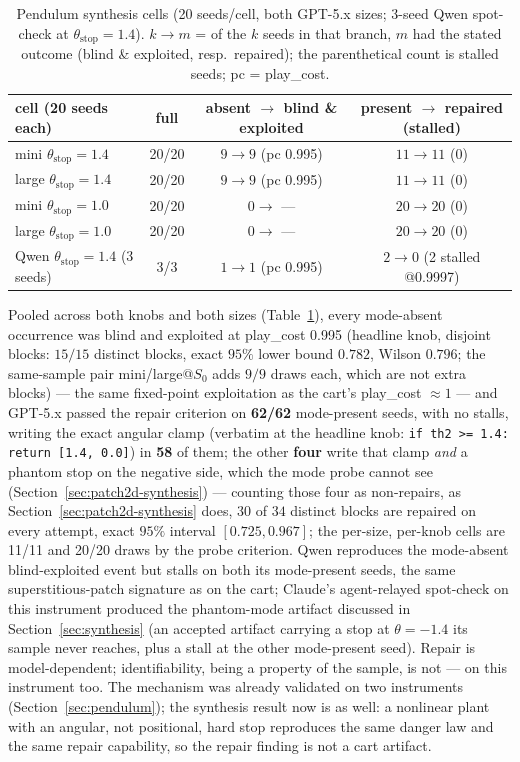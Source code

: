 \documentclass[11pt]{article}
\theoremstyle{definition}
\theoremstyle{remark}
\begin{document}
\begin{table}[ht]
\centering
\footnotesize
\begin{tabular}{lccc}
\toprule
cell (20 seeds each) & full & absent $\to$ blind \& exploited & present $\to$ repaired (stalled) \\
\midrule
mini $\theta_\mathrm{stop}=1.4$ & 20/20 & $9 \to 9$ (pc 0.995) & $11 \to 11$ (0) \\
large $\theta_\mathrm{stop}=1.4$ & 20/20 & $9 \to 9$ (pc 0.995) & $11 \to 11$ (0) \\
mini $\theta_\mathrm{stop}=1.0$ & 20/20 & $0 \to$ --- & $20 \to 20$ (0) \\
large $\theta_\mathrm{stop}=1.0$ & 20/20 & $0 \to$ --- & $20 \to 20$ (0) \\
Qwen $\theta_\mathrm{stop}=1.4$ (3 seeds) & 3/3 & $1 \to 1$ (pc 0.995) & $2 \to 0$ (2 stalled @0.9997) \\
\bottomrule
\end{tabular}
\caption{Pendulum synthesis cells (20 seeds/cell, both GPT-5.x sizes; 3-seed Qwen spot-check at $\theta_\mathrm{stop}=1.4$). $k \to m$ = of the $k$ seeds in that branch, $m$ had the stated outcome (blind \& exploited, resp.\ repaired); the parenthetical count is stalled seeds; pc = play\_cost.}
\label{tab:pendulum-synthesis}
\end{table}

Pooled across both knobs and both sizes (Table~\ref{tab:pendulum-synthesis}), every mode-absent occurrence was blind and exploited at play\_cost 0.995 (headline knob, disjoint blocks: $15/15$ distinct blocks, exact $95\%$ lower bound $0.782$, Wilson $0.796$; the same-sample pair mini/large@$S_0$ adds $9/9$ draws each, which are not extra blocks) --- the same fixed-point exploitation as the cart's play\_cost $\approx 1$ --- and GPT-5.x passed the repair criterion on \textbf{62/62} mode-present seeds, with no stalls, writing the exact angular clamp (verbatim at the headline knob: \texttt{if th2 >= 1.4: return [1.4, 0.0]}) in \textbf{58} of them; the other \textbf{four} write that clamp \emph{and} a phantom stop on the negative side, which the mode probe cannot see (Section~\ref{sec:patch2d-synthesis}) --- counting those four as non-repairs, as Section~\ref{sec:patch2d-synthesis} does, $30$ of $34$ distinct blocks are repaired on every attempt, exact $95\%$ interval $[0.725, 0.967]$; the per-size, per-knob cells are 11/11 and 20/20 draws by the probe criterion. Qwen reproduces the mode-absent blind-exploited event but stalls on both its mode-present seeds, the same superstitious-patch signature as on the cart; Claude's agent-relayed spot-check on this instrument produced the phantom-mode artifact discussed in Section~\ref{sec:synthesis} (an accepted artifact carrying a stop at $\theta = -1.4$ its sample never reaches, plus a stall at the other mode-present seed). Repair is model-dependent; identifiability, being a property of the sample, is not --- on this instrument too. The mechanism was already validated on two instruments (Section~\ref{sec:pendulum}); the synthesis result now is as well: a nonlinear plant with an angular, not positional, hard stop reproduces the same danger law and the same repair capability, so the repair finding is not a cart artifact.
\end{document}
